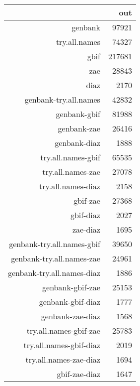 \begin{tabular}{rr}
  \toprule
 & out \\ 
  \midrule
genbank & 97921 \\ 
  try.all.names & 74327 \\ 
  gbif & 217681 \\ 
  zae & 28843 \\ 
  diaz & 2170 \\ 
  genbank-try.all.names & 42832 \\ 
  genbank-gbif & 81988 \\ 
  genbank-zae & 26416 \\ 
  genbank-diaz & 1888 \\ 
  try.all.names-gbif & 65535 \\ 
  try.all.names-zae & 27078 \\ 
  try.all.names-diaz & 2158 \\ 
  gbif-zae & 27368 \\ 
  gbif-diaz & 2027 \\ 
  zae-diaz & 1695 \\ 
  genbank-try.all.names-gbif & 39650 \\ 
  genbank-try.all.names-zae & 24961 \\ 
  genbank-try.all.names-diaz & 1886 \\ 
  genbank-gbif-zae & 25153 \\ 
  genbank-gbif-diaz & 1777 \\ 
  genbank-zae-diaz & 1568 \\ 
  try.all.names-gbif-zae & 25783 \\ 
  try.all.names-gbif-diaz & 2019 \\ 
  try.all.names-zae-diaz & 1694 \\ 
  gbif-zae-diaz & 1647 \\ 
   \bottomrule
\end{tabular}
